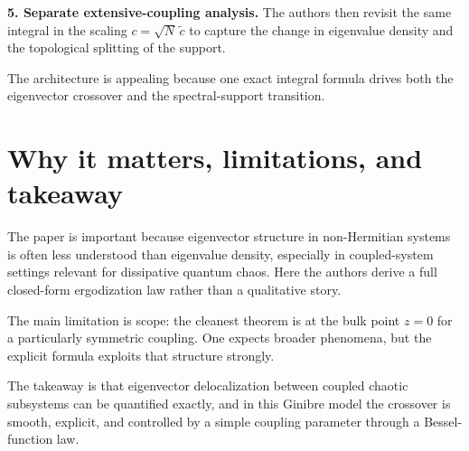 \documentclass[11pt]{article}
\begin{document}
\textbf{5. Separate extensive-coupling analysis.} The authors then revisit the same integral in the scaling $c=\sqrt N\,\tilde c$ to capture the change in eigenvalue density and the topological splitting of the support.

The architecture is appealing because one exact integral formula drives both the eigenvector crossover and the spectral-support transition.

\section*{Why it matters, limitations, and takeaway}
The paper is important because eigenvector structure in non-Hermitian systems is often less understood than eigenvalue density, especially in coupled-system settings relevant for dissipative quantum chaos. Here the authors derive a full closed-form ergodization law rather than a qualitative story.

The main limitation is scope: the cleanest theorem is at the bulk point $z=0$ for a particularly symmetric coupling. One expects broader phenomena, but the explicit formula exploits that structure strongly.

The takeaway is that eigenvector delocalization between coupled chaotic subsystems can be quantified exactly, and in this Ginibre model the crossover is smooth, explicit, and controlled by a simple coupling parameter through a Bessel-function law.
\end{document}
